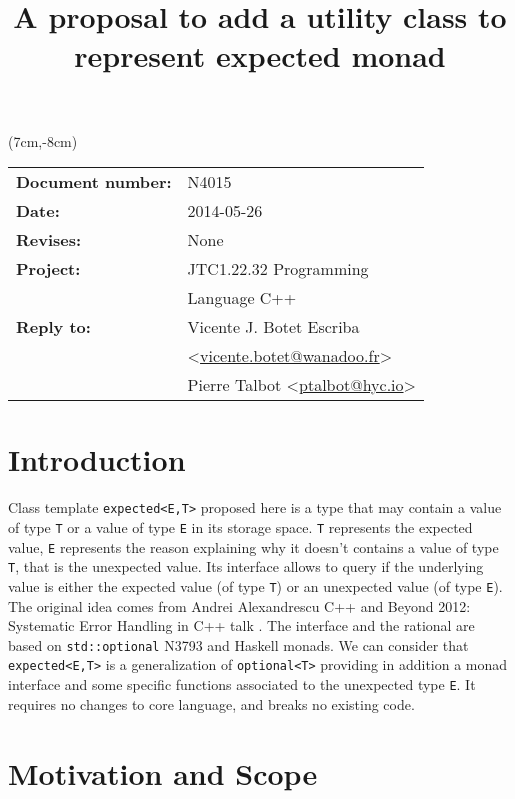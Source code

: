 \documentclass[a4paper,10pt]{article}
\title{A proposal to add a utility class to represent expected monad}
\author{}
\date{}
\newcommand{\cpp}[1]{\lstinline{#1}}
\begin{document}
\maketitle
\begin{textblock*}{9cm}(7cm,-8cm)
\begin{tabular}{l l}
\textbf{Document number:} & N4015 \\
\textbf{Date:}  & 2014-05-26 \\
\textbf{Revises:} & None \\
\textbf{Project:} & JTC1.22.32 Programming \\
 & Language C++ \\
\textbf{Reply to:} & Vicente J. Botet Escriba \\
 & <\href{mailto:vicente.botet@wanadoo.fr}{vicente.botet@wanadoo.fr}> \\
 & Pierre Talbot <\href{mailto:ptalbot@hyc.io}{ptalbot@hyc.io}>
\end{tabular}
\end{textblock*}

\vspace{-6em}
\setcounter{tocdepth}{1}
\tableofcontents

\section{Introduction}

Class template \cpp{expected<E,T>} proposed here is a type that may contain a value of type \cpp{T} or a value of type \cpp{E} in its storage space. \cpp{T} represents the expected value, \cpp{E} represents the reason explaining why it doesn't contains a value of type \cpp{T}, that is the unexpected value. Its interface allows to query if the underlying value is either the expected value (of type \cpp{T}) or an unexpected value (of type \cpp{E}). The original idea comes from Andrei Alexandrescu C++ and Beyond 2012: Systematic Error Handling in C++ talk \cite{AlexandrescuExpected}. The interface and the rational are based on \cpp{std::optional} N3793 \cite{OptionalRev5} and Haskell monads. We can consider that \cpp{expected<E,T>} is a generalization of \cpp{optional<T>} providing in addition a monad interface and some specific functions associated to the unexpected type \cpp{E}. It requires no changes to core language, and breaks no existing code.

\section{Motivation and Scope}
\label{motiv-scope}
\end{document}
